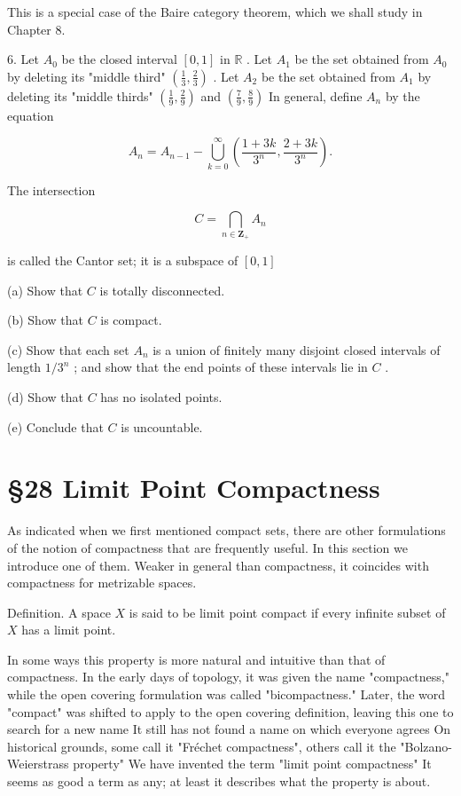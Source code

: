 This is a special case of the Baire category theorem, which we shall study in Chapter 8.

6. Let \({A}_{0}\) be the closed interval \(\left\lbrack  {0,1}\right\rbrack\) in \(\mathbb{R}\) . Let \({A}_{1}\) be the set obtained from \({A}_{0}\) by deleting its "middle third" \(\left( {\frac{1}{3},\frac{2}{3}}\right)\) . Let \({A}_{2}\) be the set obtained from \({A}_{1}\) by deleting its "middle thirds" \(\left( {\frac{1}{9},\frac{2}{9}}\right)\) and \(\left( {\frac{7}{9},\frac{8}{9}}\right)\) In general, define \({A}_{n}\) by the equation

\[
{A}_{n} = {A}_{n - 1} - \mathop{\bigcup }\limits_{{k = 0}}^{\infty }\left( {\frac{1 + {3k}}{{3}^{n}},\frac{2 + {3k}}{{3}^{n}}}\right) .
\]

The intersection

\[
C = \mathop{\bigcap }\limits_{{n \in  {\mathbf{Z}}_{ + }}}{A}_{n}
\]

is called the Cantor set; it is a subspace of \(\left\lbrack  {0,1}\right\rbrack\)

(a) Show that \(C\) is totally disconnected.

(b) Show that \(C\) is compact.

(c) Show that each set \({A}_{n}\) is a union of finitely many disjoint closed intervals of length \(1/{3}^{n}\) ; and show that the end points of these intervals lie in \(C\) .

(d) Show that \(C\) has no isolated points.

(e) Conclude that \(C\) is uncountable.

\section*{§28 Limit Point Compactness}

As indicated when we first mentioned compact sets, there are other formulations of the notion of compactness that are frequently useful. In this section we introduce one of them. Weaker in general than compactness, it coincides with compactness for metrizable spaces.

Definition. A space \(X\) is said to be limit point compact if every infinite subset of \(X\) has a limit point.

In some ways this property is more natural and intuitive than that of compactness. In the early days of topology, it was given the name "compactness," while the open covering formulation was called "bicompactness." Later, the word "compact" was shifted to apply to the open covering definition, leaving this one to search for a new name It still has not found a name on which everyone agrees On historical grounds, some call it "Fréchet compactness", others call it the "Bolzano-Weierstrass property" We have invented the term "limit point compactness" It seems as good a term as any; at least it describes what the property is about.

